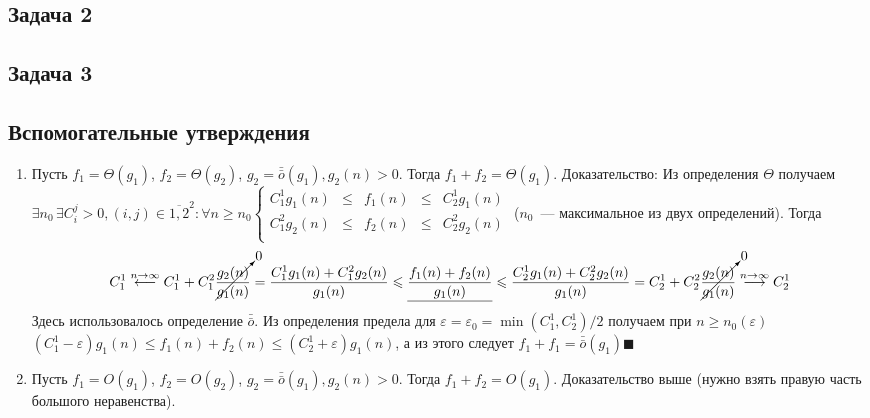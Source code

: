 \documentclass[a4paper]{article}
\def\eps{\varepsilon}
\newcommand{\smallo}{\bar{\bar{o}}}
\begin{document}
\subsection*{Задача 2}
\subsection*{Задача 3}
\subsection*{Вспомогательные утверждения}
\begin{enumerate}
\item \label{smallg2} Пусть $f_1=\Theta(g_1)$, $f_2=\Theta(g_2)$, $g_2=\smallo(g_1), g_2(n)>0$. Тогда $f_1+f_2=\Theta(g_1)$. Доказательство:\newline
Из определения $\Theta$ получаем $\exists n_0\,\exists C_i^j>0, (i,j)\in \overline{1,2}^2\colon\forall n\geqslant n_0 \left\{\begin{array}{lllll}
C_1^1g_1(n) & \leqslant & f_1(n) & \leqslant & C_2^1 g_1(n)\\
C_1^2g_2(n) & \leqslant & f_2(n) & \leqslant & C_2^2 g_2(n)\\
\end{array}\right.$ ($n_0$~--- максимальное из двух определений).
Тогда $$C_1^1\overset{n\to\infty}{\longleftarrow}C_1^1+C_1^2\cancelto{0}{\frac{g_2(n)}{g_1(n)}}=\frac{C_1^1 g_1(n)+C_1^2 g_2(n)}{g_1(n)}\leqslant\underline{\frac{f_1(n)+f_2(n)}{g_1(n)}}\leqslant \frac{C_2^1 g_1(n)+C_2^2 g_2(n)}{g_1(n)}=C_2^1+C_2^2\cancelto{0}{\frac{g_2(n)}{g_1(n)}}\overset{n\to\infty}{\longrightarrow}C_2^1$$
Здесь использовалось определение $\smallo$. Из определения предела для $\eps=\eps_0=\min(C_1^1,C_2^1)/2$ получаем при $n\geqslant n_0(\eps)$ $(C^1_1-\eps)g_1(n)\leqslant f_1(n)+f_2(n)\leqslant (C_2^1+\eps)g_1(n)$, а из этого следует $f_1+f_1=\smallo(g_1)\blacksquare$
\item \label{smallg2O} Пусть $f_1=O(g_1)$, $f_2=O(g_2)$, $g_2=\smallo(g_1), g_2(n)>0$. Тогда $f_1+f_2=O(g_1)$. Доказательство выше (нужно взять правую часть большого неравенства).
\end{enumerate}
\end{document}
